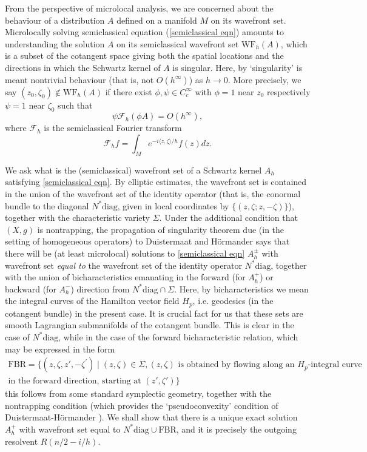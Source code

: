 \documentclass[10pt, a4paper, twoside]{amsart}
\numberwithin{equation}{section}
\theoremstyle{remark}
\begin{document}
From the perspective of microlocal analysis, we are concerned about the behaviour of a distribution $A$ defined on a manifold $M$ on its wavefront set. Microlocally solving semiclassical equation (\ref{semiclassical eqn}) amounts to understanding the solution $A$ on its semiclassical wavefront set $\text{WF}_h (A)$, which is a subset of the cotangent space giving both the spatial locations and the directions in which  the Schwartz kernel of $A$ is singular. Here, by `singularity' is meant nontrivial behaviour (that is, not $O(h^\infty)$) as $h \to 0$. More precisely,  we say $(z_0, \zeta_0) \notin \text{WF}_h (A)$ if there exist $\phi, \psi \in C_c^\infty$ with $\phi = 1$ near $z_0$ respectively $\psi = 1$ near $\zeta_0$ such that $$\psi \mathcal{F}_h (\phi A) = O(h^\infty), $$
where $\mathcal{F}_h$ is the semiclassical Fourier transform
$$\mathcal{F}_h f = \int_{M} e^{- i \langle z, \zeta \rangle / h} f(z) dz.$$

We ask what is the (semiclassical) wavefront set of a Schwartz kernel $A_h$ satisfying \eqref{semiclassical eqn}. By elliptic estimates, the wavefront set is contained in the union of the wavefront set of the identity operator (that is, the conormal bundle to the diagonal $N^* {\mathrm{diag}}$, given in local coordinates by $\{ (z, \zeta; z, -\zeta) \}$), together with the characteristic variety $\Sigma$. Under the additional condition that $(X, g)$ is nontrapping, the propagation of singularity theorem due (in the setting of homogeneous operators) to Duistermaat and H\"ormander \cite{Duistermaat-Hormander-Acta-1972} says that there will be (at least microlocal) solutions to \eqref{semiclassical eqn} $A_h^\pm$ with wavefront set 
 \emph{equal to} the wavefront set of the identity operator $N^* {\mathrm{diag}}$, together with the union of bicharacteristics emanating in the forward (for $A_h^+$) or backward (for $A_h^-$) direction from $N^* {\mathrm{diag}} \cap \Sigma$. Here, by bicharacteristics we mean the integral curves of the Hamilton vector field $H_p$, i.e. geodesics (in the cotangent bundle) in the present case.  It is crucial fact for us that these sets are smooth Lagrangian submanifolds of the cotangent bundle. This is clear in the case of $N^* {\mathrm{diag}}$, while in the case of the forward bicharacteristic relation, which may be expressed in the form
\begin{multline} 
{\mathrm{FBR}} = \{(z, \zeta, z', -\zeta^\prime) \mid (z, \zeta) \in \Sigma, (z, \zeta) \text{ is obtained by flowing along an $H_p$-integral curve }   \\
\mbox{in the forward direction, starting at } (z', \zeta') \}
\label{Lambda1def}\end{multline}
this follows from some standard symplectic geometry, together with the nontrapping condition (which provides the `pseudoconvexity' condition of Duistermaat-H\"ormander \cite{Duistermaat-Hormander-Acta-1972}). We shall show that there is a unique exact solution $A_h^+$ with wavefront set equal to $N^* {\mathrm{diag}} \cup {\mathrm{FBR}}$, and it is precisely the outgoing resolvent $R(n/2 - i/h)$. 
\end{document}

